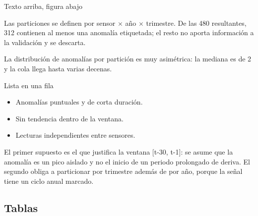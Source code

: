 \documentclass[aspectratio=169,9pt]{beamer}
\begin{document}
\begin{frame}{Texto arriba, figura abajo}
\begin{tworows}

  Las particiones se definen por sensor $\times$ año $\times$ trimestre. De
  las 480 resultantes, 312 contienen al menos una anomalía etiquetada; el
  resto no aporta información a la validación y se descarta.

  La distribución de anomalías por partición es muy asimétrica: la mediana
  es de 2 y la cola llega hasta varias decenas.
\nextrow
\end{tworows}
\end{frame}

\begin{frame}{Lista en una fila}
\begin{tworows}

  \begin{itemize}
    \item Anomalías puntuales y de corta duración.
    \item Sin tendencia dentro de la ventana.
    \item Lecturas independientes entre sensores.
  \end{itemize}
\nextrow

  El primer supuesto es el que justifica la ventana [t-30, t-1]: se asume
  que la anomalía es un pico aislado y no el inicio de un periodo prolongado
  de deriva. El segundo obliga a particionar por trimestre además de por
  año, porque la señal tiene un ciclo anual marcado.
\end{tworows}
\end{frame}

\subsection{Tablas}
\end{document}
